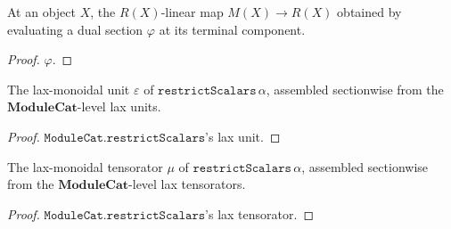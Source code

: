 \begin{definition}\label{mk-def:eval_lin}
  \leanok

  At an object \(X\), the \(R(X)\)-linear map \(M(X) \to R(X)\) obtained by evaluating
  a dual section \(\varphi\) at its terminal component.
\end{definition}
\begin{proof}
  \leanok
  \(\varphi\).
\end{proof}

\begin{definition}\label{mk-def:restrict_scalars_lax_epsilon}
  \leanok

  The lax-monoidal unit \(\varepsilon\) of \(\mathtt{restrictScalars}\,\alpha\),
  assembled sectionwise from the \(\mathbf{ModuleCat}\)-level lax units.
\end{definition}
\begin{proof}
  \leanok
  \(\mathtt{ModuleCat.restrictScalars}\)'s lax unit.
\end{proof}

\begin{definition}\label{mk-def:restrict_scalars_lax_mu}
  \leanok

  The lax-monoidal tensorator \(\mu\) of \(\mathtt{restrictScalars}\,\alpha\),
  assembled sectionwise from the \(\mathbf{ModuleCat}\)-level lax tensorators.
\end{definition}
\begin{proof}
  \leanok
  \(\mathtt{ModuleCat.restrictScalars}\)'s lax tensorator.
\end{proof}

